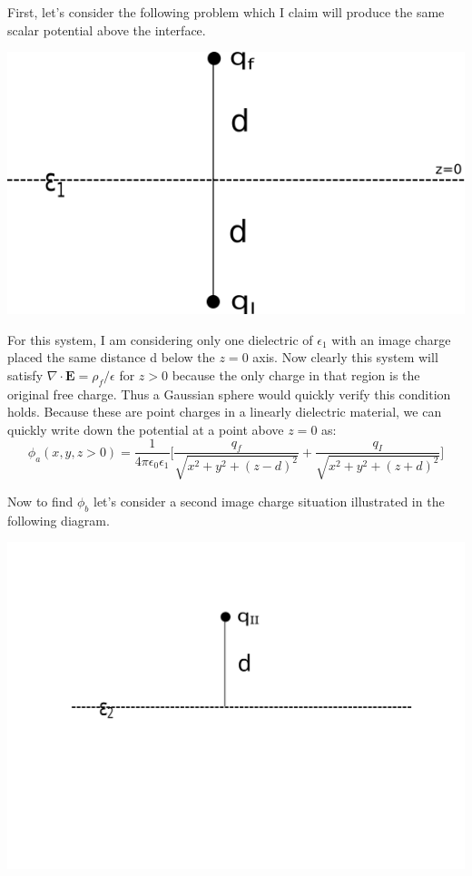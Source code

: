 \documentclass[a4paper, 11pt]{article}
\begin{document}
\noindent First, let's consider the following problem which I claim will produce the same scalar potential above the interface. 
		\begin{center}
			\includegraphics[scale=0.5]{fig1}
		\end{center}
For this system, I am considering only one dielectric of $\epsilon_1$ with an image charge placed the same distance d below the $z=0$ axis. Now clearly this system will satisfy $\nabla \cdot \mathbf{E} = \rho_f/\epsilon$ for $z > 0$ because the only charge in that region is the original free charge. Thus a Gaussian sphere would quickly verify this condition holds. 	Because these are point charges in a linearly dielectric material, we can quickly write down the potential at a point above $z=0$ as: 
	\begin{equation}
		\phi_a(x,y,z>0) = \frac{1}{4\pi\epsilon_0\epsilon_1}\Bigg[ \frac{q_f}{\sqrt{x^2+y^2+(z-d)^2}}+ \frac{q_I}{\sqrt{x^2+y^2+(z+d)^2}}\Bigg] 
	\end{equation}
	
\noindent Now to find $\phi_b$ let's consider a second image charge situation illustrated in the following diagram. \\
	\begin{center}
		\includegraphics[scale=0.5]{fig2}
	\end{center}
	
\end{document}
